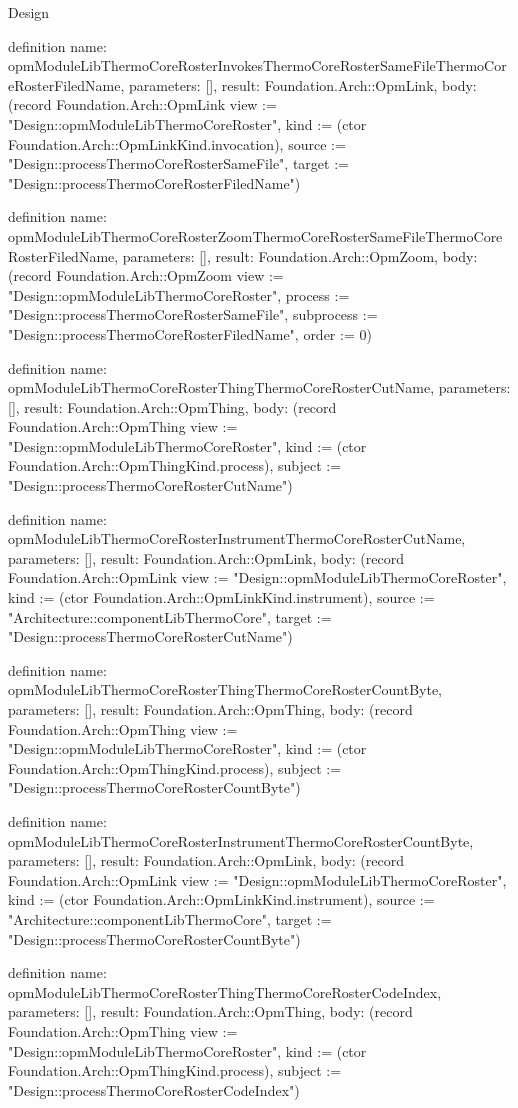 \begin{lexlean}{Design}
\begin{semanticmodule}
definition{
  name: opmModuleLibThermoCoreRosterInvokesThermoCoreRosterSameFileThermoCoreRosterFiledName,
  parameters: [],
  result: Foundation.Arch::OpmLink,
  body: (record Foundation.Arch::OpmLink {view := "Design::opmModuleLibThermoCoreRoster", kind := (ctor Foundation.Arch::OpmLinkKind.invocation), source := "Design::processThermoCoreRosterSameFile", target := "Design::processThermoCoreRosterFiledName"})
}

definition{
  name: opmModuleLibThermoCoreRosterZoomThermoCoreRosterSameFileThermoCoreRosterFiledName,
  parameters: [],
  result: Foundation.Arch::OpmZoom,
  body: (record Foundation.Arch::OpmZoom {view := "Design::opmModuleLibThermoCoreRoster", process := "Design::processThermoCoreRosterSameFile", subprocess := "Design::processThermoCoreRosterFiledName", order := 0})
}

definition{
  name: opmModuleLibThermoCoreRosterThingThermoCoreRosterCutName,
  parameters: [],
  result: Foundation.Arch::OpmThing,
  body: (record Foundation.Arch::OpmThing {view := "Design::opmModuleLibThermoCoreRoster", kind := (ctor Foundation.Arch::OpmThingKind.process), subject := "Design::processThermoCoreRosterCutName"})
}

definition{
  name: opmModuleLibThermoCoreRosterInstrumentThermoCoreRosterCutName,
  parameters: [],
  result: Foundation.Arch::OpmLink,
  body: (record Foundation.Arch::OpmLink {view := "Design::opmModuleLibThermoCoreRoster", kind := (ctor Foundation.Arch::OpmLinkKind.instrument), source := "Architecture::componentLibThermoCore", target := "Design::processThermoCoreRosterCutName"})
}

definition{
  name: opmModuleLibThermoCoreRosterThingThermoCoreRosterCountByte,
  parameters: [],
  result: Foundation.Arch::OpmThing,
  body: (record Foundation.Arch::OpmThing {view := "Design::opmModuleLibThermoCoreRoster", kind := (ctor Foundation.Arch::OpmThingKind.process), subject := "Design::processThermoCoreRosterCountByte"})
}

definition{
  name: opmModuleLibThermoCoreRosterInstrumentThermoCoreRosterCountByte,
  parameters: [],
  result: Foundation.Arch::OpmLink,
  body: (record Foundation.Arch::OpmLink {view := "Design::opmModuleLibThermoCoreRoster", kind := (ctor Foundation.Arch::OpmLinkKind.instrument), source := "Architecture::componentLibThermoCore", target := "Design::processThermoCoreRosterCountByte"})
}

definition{
  name: opmModuleLibThermoCoreRosterThingThermoCoreRosterCodeIndex,
  parameters: [],
  result: Foundation.Arch::OpmThing,
  body: (record Foundation.Arch::OpmThing {view := "Design::opmModuleLibThermoCoreRoster", kind := (ctor Foundation.Arch::OpmThingKind.process), subject := "Design::processThermoCoreRosterCodeIndex"})
}


\end{semanticmodule}
\end{lexlean}
